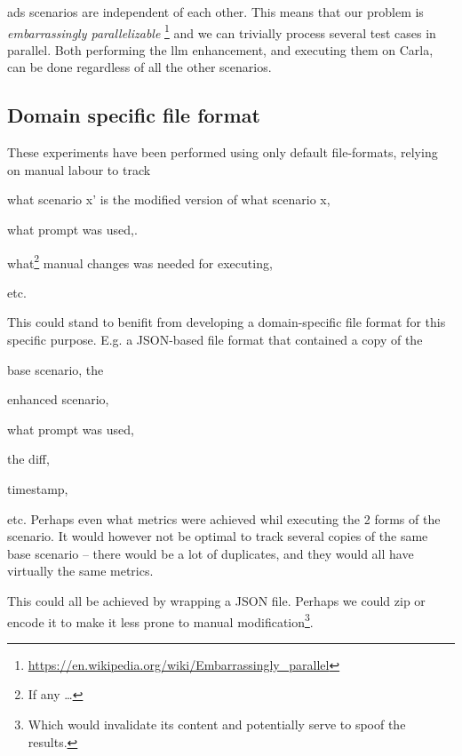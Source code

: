 \acrshort{ads} scenarios are independent of each other. This means that our problem is
\textit{embarrassingly parallelizable}
\footnote{\url{https://en.wikipedia.org/wiki/Embarrassingly_parallel}} and we can trivially process
several test cases in parallel. Both performing the \acrshort{llm} enhancement, and executing them
on Carla, can be done regardless of all the other scenarios.


\subsection{Domain specific file format}

These experiments have been performed using only default file-formats, relying on manual labour to
track \begin{inparaenum}
    \item what scenario x' is the modified version of what scenario x,
    \item what prompt was used,.
    \item what\footnote{If any \ldots} manual changes was needed for executing,
\end{inparaenum} etc.

This could stand to benifit from developing a domain-specific file format for this specific purpose.
E.g. a JSON-based file format that contained a copy of the \begin{inparaenum}
    \item base scenario, the
    \item enhanced scenario,
    \item what prompt was used,
    \item the diff,
    \item timestamp,
\end{inparaenum} etc. Perhaps even what metrics were achieved whil executing the 2 forms of the
scenario. It would however not be optimal to track several copies of the same base scenario -- there
would be a lot of duplicates, and they would all have virtually the same metrics.

This could all be achieved by wrapping a JSON file. Perhaps we could zip or encode it to make it
less prone to manual modification\footnote{Which would invalidate its content and potentially serve
    to spoof the results.}.
